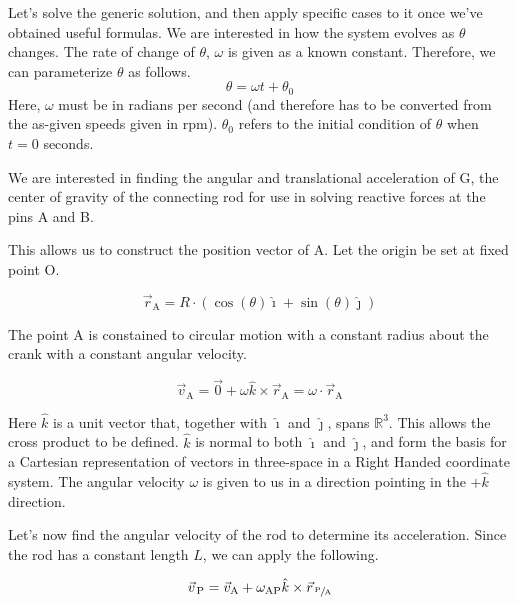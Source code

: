\documentclass[nofoot,pdf-a,balance,colorlinks,upint,subscriptcorrection,varvw,mathalfa=cal=boondoxo]{asmeconf}
\begin{document}
    Let's solve the generic solution, and then apply specific cases to it once we've obtained useful formulas. We are interested in how the system evolves as $\theta$ changes. The rate of change of $\theta$, $\omega$ is given as a known constant. Therefore, we can parameterize $\theta$ as follows.
    \begin{equation} 
        \theta = \omega t + \theta_0
    \end{equation}
    Here, $\omega$ must be in radians per second (and therefore has to be converted from the as-given speeds given in rpm). $\theta_0$ refers to the initial condition of $\theta$ when $t = 0$ seconds.

    We are interested in finding the angular and translational acceleration of G, the center of gravity of the connecting rod for use in solving reactive forces at the pins A and B.


    This allows us to construct the position vector of A. Let the origin be set at fixed point O.

    \begin{equation} 
        \vec{r}_{\textrm{A}} = R\cdot\left(\cos{\left(\theta\right)}\hat{\imath} + \sin{\left(\theta\right)}\hat{\jmath}\right)
    \end{equation}


    The point A is constained to circular motion with a constant radius about the crank with a constant angular velocity.

    \begin{equation} 
        \vec{v}_{\textrm{A}} = \vec{0} + \omega\hat{k}\times\vec{r}_{\textrm{A}} = \omega\cdot\vec{r}_{\textrm{A}}
    \end{equation}


    Here $\hat{k}$ is a unit vector that, together with $\hat{\imath}$ and $\hat{\jmath}$, spans $\mathbb{R}^3$. This allows the cross product to be defined. $\hat{k}$ is normal to both $\hat{\imath}$ and $\hat{\jmath}$, and form the basis for a Cartesian representation of vectors in three-space in a Right Handed coordinate system. The angular velocity $\omega$ is given to us in a direction pointing in the $+\hat{k}$ direction.

    Let's now find the angular velocity of the rod to determine its acceleration. Since the rod has a constant length $L$, we can apply the following.

    \begin{equation} 
        \vec{v}_{\,\textrm{P}} = \vec{v}_{\textrm{A}} + \omega_{\textrm{AP}}\hat{k}\times \vec{r}_{\,\sfrac{\textrm{P}}{\textrm{A}}}
    \end{equation}
\end{document}
